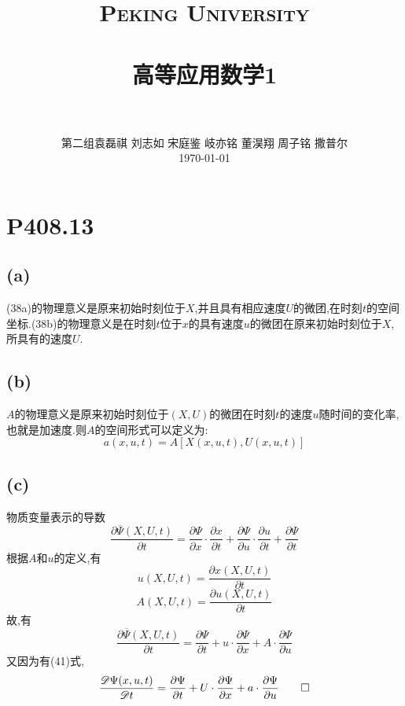 \documentclass[12pt]{article}
\title{
		\vspace{-1in} 	
		\usefont{OT1}{bch}{b}{n}
		\normalfont \normalsize \textsc{\LARGE Peking University}\\[1cm] %
		\horrule{0.5pt} \\[0.5cm]
		\huge \bfseries{高等应用数学1} \\
		\horrule{2pt} \\[0.5cm]
}
\author{
		\normalfont 								\normalsize
		第二组\quad 袁磊祺 \quad 刘志如 \quad 宋庭鉴 \quad 岐亦铭 \quad 董淏翔 \quad 周子铭 \quad 撒普尔\\	\normalsize
        \today
}
\date{}
\begin{document}
% 

\maketitle

\section{P408.13}



\subsection{(a)}

(38a)的物理意义是原来初始时刻位于$X$,并且具有相应速度$U$的微团,在时刻$t$的空间坐标.(38b)的物理意义是在时刻$t$位于$x$的具有速度$u$的微团在原来初始时刻位于$X$,所具有的速度$U$.

\subsection{(b)}

$A$的物理意义是原来初始时刻位于$(X,U)$的微团在时刻$t$的速度$u$随时间的变化率,也就是加速度.则$A$的空间形式可以定义为:
\begin{equation}
	a(x,u,t)=A[X(x,u,t), U(x,u,t)]
\end{equation}

\subsection{(c)}
物质变量表示的导数
\begin{equation}
	\frac{\partial\overline\Psi(X,U,t)}{\partial t} = \frac{\partial\Psi}{\partial x}\cdot\frac{\partial x}{\partial t} + \frac{\partial\Psi}{\partial u}\cdot\frac{\partial u}{\partial t} + \frac{\partial\Psi}{\partial t}
\end{equation}
根据$A$和$u$的定义,有
\begin{equation}
	u(X,U,t) = \frac{\partial x(X,U,t)}{\partial t}
\end{equation}
\begin{equation}
	A(X,U,t) = \frac{\partial u(X,U,t)}{\partial t}
\end{equation}
故,有
\begin{equation}
	\frac{\partial\overline\Psi(X,U,t)}{\partial t} =
\frac{\partial\Psi}{\partial t} + u\cdot\frac{\partial\Psi}{\partial x} + A\cdot\frac{\partial\Psi}{\partial u}
\end{equation}
又因为有(41)式,
\begin{equation}
	\frac{\mathscr{D}\Psi(x,u,t)}{\mathscr{D} t} =
\frac{\partial\Psi}{\partial t} + U\cdot\frac{\partial\Psi}{\partial x} + a\cdot\frac{\partial\Psi}{\partial u}\qed
\end{equation}
\end{document}
